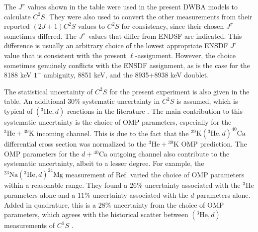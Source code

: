 The $J^{\pi}$ values shown in the table were used in the present DWBA models to calculate $C^{2}S$. They were also used to convert the other measurements from their reported $(2J+1)C^{2}S$ values to $C^{2}S$ for consistency, since their chosen $J^{\pi}$ sometimes differed. The $J^{\pi}$ values that differ from ENDSF are indicated. This difference is usually an arbitrary choice of the lowest appropriate ENSDF $J^{\pi}$ value that is consistent with the present $\ell$-assignment. However, the choice sometimes genuinely conflicts with the ENSDF assignment, as is the case for the 8188 keV $1^{+}$ ambiguity, 8851 keV, and the 8935+8938 keV doublet.

The statistical uncertainty of $C^{2}S$ for the present experiment is also given in the table. An additional $30\%$ systematic uncertainty in $C^{2}S$ is assumed, which is typical of $(^{3}\mathrm{He},d)$ reactions in the literature \cite{Endt1977}. The main contribution to this systematic uncertainty is the choice of OMP parameters, especially for the $^{3}\mathrm{He} + {}^{39}\mathrm{K}$ incoming channel. This is due to the fact that the $^{39}\mathrm{K}(^{3}\mathrm{He},d)^{40}\mathrm{Ca}$ differential cross section was normalized to the $^{3}\mathrm{He} + {}^{39}\mathrm{K}$ OMP prediction. The OMP parameters for the $d + {}^{40}\mathrm{Ca}$ outgoing channel also contribute to the systematic uncertainty, albeit to a lesser degree. For example, the $^{23}\mathrm{Na}(^{3}\mathrm{He},d)^{24}\mathrm{Mg}$ measurement of Ref. \cite{Hale2004} varied the choice of OMP parameters within a reasonable range. They found a $26\%$ uncertainty associated with the $^{3}$He parameters alone and a $11\%$ uncertainty associated with the $d$ parameters alone. Added in quadrature, this is a $28\%$ uncertainty from the choice of OMP parameters, which agrees with the historical scatter between $(^{3}\mathrm{He},d)$ measurements of $C^{2}S$ \cite{Endt1977}.



\newpage

